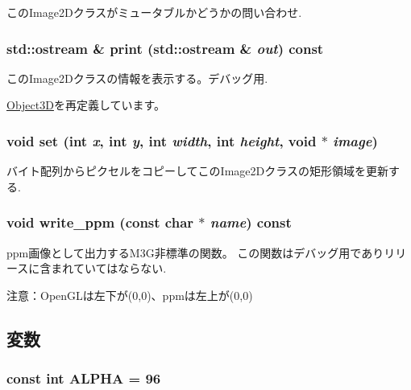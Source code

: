 このImage2Dクラスがミュータブルかどうかの問い合わせ. \hypertarget{classm3g_1_1Image2D_6fea17fa1532df3794f8cb39cb4f911f}{
\subsubsection[{print}]{\setlength{\rightskip}{0pt plus 5cm}std::ostream \& print (std::ostream \& {\em out}) const}}
\label{classm3g_1_1Image2D_6fea17fa1532df3794f8cb39cb4f911f}


このImage2Dクラスの情報を表示する。デバッグ用. 

\hyperlink{classm3g_1_1Object3D_6fea17fa1532df3794f8cb39cb4f911f}{Object3D}を再定義しています。\hypertarget{classm3g_1_1Image2D_fe9ef1abefb9e92b38687e27c9004bdc}{
\subsubsection[{set}]{\setlength{\rightskip}{0pt plus 5cm}void set (int {\em x}, \/  int {\em y}, \/  int {\em width}, \/  int {\em height}, \/  void $\ast$ {\em image})}}
\label{classm3g_1_1Image2D_fe9ef1abefb9e92b38687e27c9004bdc}


バイト配列からピクセルをコピーしてこのImage2Dクラスの矩形領域を更新する. \hypertarget{classm3g_1_1Image2D_32ee5b2bcc9c7bf69b925413eeccb4bf}{
\subsubsection[{write\_\-ppm}]{\setlength{\rightskip}{0pt plus 5cm}void write\_\-ppm (const char $\ast$ {\em name}) const}}
\label{classm3g_1_1Image2D_32ee5b2bcc9c7bf69b925413eeccb4bf}


ppm画像として出力するM3G非標準の関数。 この関数はデバッグ用でありリリースに含まれていてはならない.

注意：OpenGLは左下が(0,0)、ppmは左上が(0,0) 

\subsection{変数}
\hypertarget{classm3g_1_1Image2D_417581fcde4067111f47320edb2aa378}{
\subsubsection[{ALPHA}]{\setlength{\rightskip}{0pt plus 5cm}const int {\bf ALPHA} = 96}}
\label{classm3g_1_1Image2D_417581fcde4067111f47320edb2aa378}


